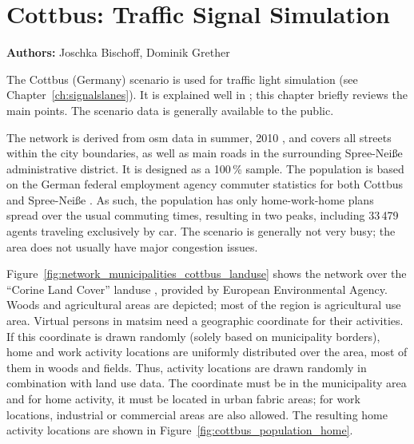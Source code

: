 \chapter{Cottbus: Traffic Signal Simulation}
\label{ch:cottbus} \hfill \textbf{Authors:} Joschka Bischoff, Dominik Grether 

The Cottbus (Germany) scenario 
is used for traffic light simulation (see Chapter~\ref{ch:signalslanes}). 
It is explained well in \citet[][pp.~87]{Grether_PhDThesis_2014}; this chapter briefly reviews the main points. 
The scenario data is generally available to the public.

The network is derived from \gls{osm} data in summer, 2010 \citep{Bischoff2010BaSylvia}, and 
covers all streets within the city boundaries, as well as main roads in the surrounding Spree-Neiße administrative district.  
It is designed as a 100\,\% sample. 
The population is based on the German federal employment agency commuter statistics for both Cottbus and Spree-Neiße \citep{WiethoelterBogaiCarstensen2010IABPendlerberichtBB}. 
As such, the population has only home-work-home plans spread over the usual commuting times, resulting in two peaks, including 
33\,479 agents traveling exclusively by car. 
The scenario is generally not very busy; the area does not usually have major congestion issues.

Figure~\ref{fig:network_municipalities_cottbus_landuse} shows the network over the 
``Corine Land Cover'' landuse \citep{CorineLandCover2006Data}, provided by European Environmental Agency. 
Woods and agricultural areas are depicted; most of the region is agricultural use area.  
Virtual persons in \gls{matsim} need a geographic coordinate for their activities. 
If this coordinate is drawn randomly (solely based on municipality borders), home and work activity locations are uniformly distributed over  the area, \ie most of them in woods and fields. 
Thus, activity locations are drawn randomly in combination with land use data. 
The coordinate must be in the municipality area and for home activity, it must be located in urban fabric areas; for work locations, industrial or commercial areas are also allowed. 
The resulting home activity locations are shown in Figure~\ref{fig:cottbus_population_home}. 

